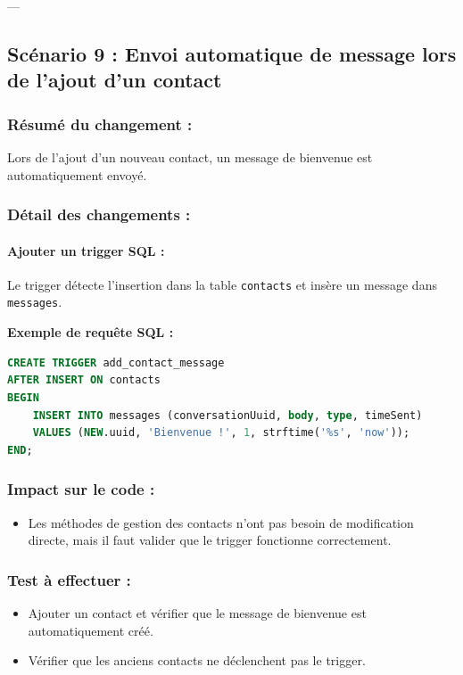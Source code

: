 \documentclass[a4paper,11pt]{article}
\begin{document}
---

\subsection*{Scénario 9 : Envoi automatique de message lors de l’ajout d’un contact}

\subsubsection*{Résumé du changement :}
Lors de l'ajout d'un nouveau contact, un message de bienvenue est automatiquement envoyé.

\subsubsection*{Détail des changements :}

\paragraph{Ajouter un trigger SQL :}
Le trigger détecte l’insertion dans la table \texttt{contacts} et insère un message dans \texttt{messages}.

\textbf{Exemple de requête SQL :}
\begin{lstlisting}[language=SQL]
CREATE TRIGGER add_contact_message 
AFTER INSERT ON contacts
BEGIN
    INSERT INTO messages (conversationUuid, body, type, timeSent)
    VALUES (NEW.uuid, 'Bienvenue !', 1, strftime('%s', 'now'));
END;
\end{lstlisting}

\subsubsection*{Impact sur le code :}
\begin{itemize}
    \item Les méthodes de gestion des contacts n'ont pas besoin de modification directe, mais il faut valider que le trigger fonctionne correctement.
\end{itemize}

\subsubsection*{Test à effectuer :}
\begin{itemize}
    \item Ajouter un contact et vérifier que le message de bienvenue est automatiquement créé.
    \item Vérifier que les anciens contacts ne déclenchent pas le trigger.
\end{itemize}
\end{document}
